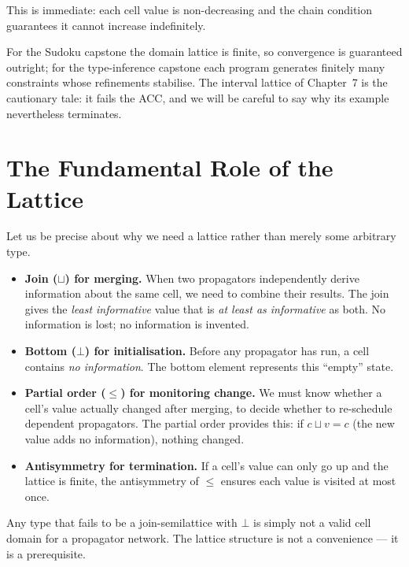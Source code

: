 \documentclass[12pt, a4paper, openright]{book}
\theoremstyle{thmstyle}
\theoremstyle{defstyle}
\begin{document}
This is immediate: each cell value is non-decreasing and the chain condition
guarantees it cannot increase indefinitely.

For the Sudoku capstone the domain lattice is finite, so convergence is
guaranteed outright; for the type-inference capstone each program generates
finitely many constraints whose refinements stabilise. The interval lattice
of Chapter~7 is the cautionary tale: it fails the ACC, and we will be
careful to say why its example nevertheless terminates.

\section{The Fundamental Role of the Lattice}

Let us be precise about why we need a lattice rather than merely some arbitrary
type.

\begin{itemize}
  \item \textbf{Join ($\sqcup$) for merging.}
    When two propagators independently derive information about the same cell,
    we need to combine their results. The join gives the \emph{least informative}
    value that is \emph{at least as informative} as both. No information is lost;
    no information is invented.

  \item \textbf{Bottom ($\bot$) for initialisation.}
    Before any propagator has run, a cell contains \emph{no information}.
    The bottom element represents this ``empty'' state.

  \item \textbf{Partial order ($\leq$) for monitoring change.}
    We must know whether a cell's value actually changed after merging, to
    decide whether to re-schedule dependent propagators. The partial order
    provides this: if $c \sqcup v = c$ (the new value adds no information),
    nothing changed.

  \item \textbf{Antisymmetry for termination.}
    If a cell's value can only go up and the lattice is finite, the antisymmetry
    of $\leq$ ensures each value is visited at most once.
\end{itemize}

Any type that fails to be a join-semilattice with $\bot$ is simply not a valid
cell domain for a propagator network. The lattice structure is not a convenience
--- it is a prerequisite.

\end{document}

